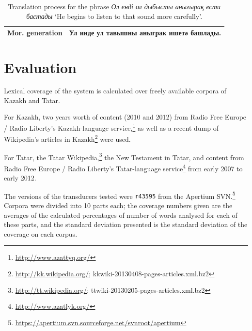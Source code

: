 \documentclass[11pt]{article}
\newcommand{\tag}[1]{{\small{\texttt{#1}}}}
\newcommand{\eng}[1]{`#1'}
\begin{document}
\begin{table}[htbp]
\begin{tabular}{ll}
\midrule
{\bf Mor. generation} & Ул инде ул тавышны аныграк ишетә башлады. \\
\bottomrule
\end{tabular}
 \caption{Translation process for the phrase \emph{Ол енді ол дыбысты анығырақ ести бастады} \eng{He begins to listen to that sound more carefully}.}
\end{table}

\section{Evaluation}
\label{sec:eval}

Lexical coverage of the system is calculated over freely available corpora of Kazakh and Tatar.

For Kazakh, two years worth of content (2010 and 2012) from Radio Free Europe / Radio Liberty's Kazakh-language service,\footnote{\url{http://www.azattyq.org/}} as well as a recent dump of Wikipedia's articles in Kazakh\footnote{\url{http://kk.wikipedia.org/}; {\smallertt kkwiki-20130408-pages-articles.xml.bz2}} were used.

For Tatar, the Tatar Wikipedia,\footnote{\url{http://tt.wikipedia.org/}; {\smallertt ttwiki-20130205-pages-articles.xml.bz2}} the New Testament in Tatar, and content from Radio Free Europe / Radio Liberty's Tatar-language service\footnote{\url{http://www.azatlyk.org/}} from early 2007 to early 2012.

The versions of the transducers tested were {\tt {\small r43595}} from the Apertium SVN.\footnote{\url{https://apertium.svn.sourceforge.net/svnroot/apertium}}  Corpora were divided into 10 parts each; the coverage numbers given are the averages of the calculated percentages of number of words analysed for each of these parts, and the standard deviation presented is the standard deviation of the coverage on each corpus.
\end{document}
